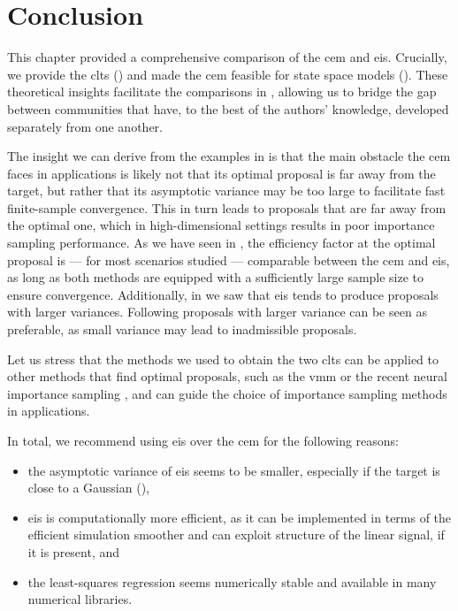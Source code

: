 \section{Conclusion}
\label{sec:03_conclusion}

This chapter provided a comprehensive comparison of the \gls{cem} and \gls{eis}. Crucially, we provide the \glspl{clt}  () and made the \gls{cem} feasible for state space models (). These theoretical insights facilitate the comparisons in , allowing us to bridge the gap between communities that have, to the best of the authors' knowledge, developed separately from one another.

The insight we can derive from the examples in  is that the main obstacle the \gls{cem} faces in applications is likely not that its optimal proposal is far away from the target, but rather that its asymptotic variance may be too large to facilitate fast finite-sample convergence. This in turn leads to proposals that are far away from the optimal one, which in high-dimensional settings results in poor importance sampling performance. As we have seen in , the efficiency factor at the optimal proposal is --- for most scenarios studied --- comparable between the \gls{cem} and \gls{eis}, as long as both methods are equipped with a sufficiently large sample size to ensure convergence. Additionally, in  we saw that \gls{eis} tends to produce proposals with larger variances. Following  proposals with larger variance can be seen as preferable, as small variance may lead to inadmissible proposals.

Let us stress that the methods we used to obtain the two \glspl{clt} can be applied to other methods that find optimal proposals, such as the \gls{vmm} or the recent neural importance sampling \citep{Muller2019Neural}, and can guide the choice of importance sampling methods in applications.

In total, we recommend using \gls{eis} over the \gls{cem} for the following reasons:
\begin{itemize}
    \item the asymptotic variance of \gls{eis} seems to be smaller, especially if the target is close to a Gaussian (),
    \item \gls{eis} is computationally more efficient, as it can be implemented in terms of the efficient simulation smoother and can exploit structure of the linear signal, if it is present, and
    \item the least-squares regression seems numerically stable and available in many numerical libraries.
\end{itemize}